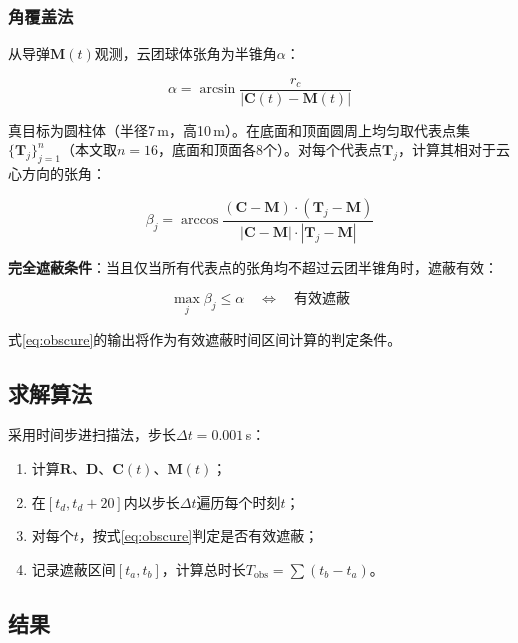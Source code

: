 \documentclass[a4paper]{ctexart}
\newcommand{\bm}[1]{\boldsymbol{#1}}
\begin{document}
\subsubsection{角覆盖法}

从导弹$\bm{M}(t)$观测，云团球体张角为半锥角$\alpha$：

\begin{equation}
\alpha = \arcsin\frac{r_c}{|\bm{C}(t) - \bm{M}(t)|}
\label{eq:alpha}
\end{equation}

真目标为圆柱体（半径7\,m，高10\,m）。在底面和顶面圆周上均匀取代表点集$\{\bm{T}_j\}_{j=1}^{n}$（本文取$n=16$，底面和顶面各8个）。对每个代表点$\bm{T}_j$，计算其相对于云心方向的张角：

\begin{equation}
\beta_j = \arccos\frac{(\bm{C} - \bm{M}) \cdot (\bm{T}_j - \bm{M})}{|\bm{C} - \bm{M}| \cdot |\bm{T}_j - \bm{M}|}
\label{eq:beta}
\end{equation}

\textbf{完全遮蔽条件}：当且仅当所有代表点的张角均不超过云团半锥角时，遮蔽有效：

\begin{equation}
\max_j \beta_j \leq \alpha \quad \Longleftrightarrow \quad \text{有效遮蔽}
\label{eq:obscure}
\end{equation}

式\eqref{eq:obscure}的输出将作为有效遮蔽时间区间计算的判定条件。

\subsection{求解算法}

采用时间步进扫描法，步长$\Delta t = 0.001$\,s：
\begin{enumerate}[label=\textbf{步骤\arabic*：}]
  \item 计算$\bm{R}$、$\bm{D}$、$\bm{C}(t)$、$\bm{M}(t)$；
  \item 在$[t_d, t_d + 20]$内以步长$\Delta t$遍历每个时刻$t$；
  \item 对每个$t$，按式\eqref{eq:obscure}判定是否有效遮蔽；
  \item 记录遮蔽区间$[t_a, t_b]$，计算总时长$T_{\text{obs}} = \sum (t_b - t_a)$。
\end{enumerate}

\subsection{结果}
\end{document}
